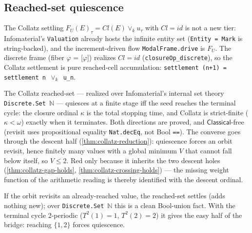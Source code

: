 \subsection{Reached-set quiescence}

\begin{theorem}[Collatz settlement realised ($Cl = id$)]
  \label{thm:collatz-settlement-realised}
  \leanok
  The Collatz settling $F_U(E)_\tau = Cl(E)\vee_k u_\tau$ with $Cl=id$ is not a
  new tier: Infomaterial's \texttt{Valuation} already hosts the infinite entity set
  (\texttt{Entity = Mark} is string-backed), and the increment-driven flow
  \texttt{ModalFrame.drive} is $F_U$. The discrete frame
  (fiber $\varphi$ = [$\varphi$]) realizes $Cl=id$ (\texttt{closureOp\_discrete}),
  so the Collatz settlement is pure reached-cell accumulation:
  \texttt{settlement (n+1) = settlement n $\vee_k$ u_n}.
\end{theorem}

\begin{theorem}
  \label{thm:collatz-kappa-stopping-time}
  \notready
  The Collatz reached-set --- realized over Infomaterial's internal set theory
  \texttt{Discrete.Set}~$\mathbb{N}$ --- quiesces at a finite stage iff the seed
  reaches the terminal cycle: the closure ordinal $\kappa$ is the total stopping
  time, and Collatz is strict-finite ($\kappa<\omega$) exactly when it
  terminates. Both directions are proved, and $\mathsf{Classical}$-free
  (revisit uses propositional equality \texttt{Nat.decEq}, not Bool
  \texttt{==}). The converse goes through the descent half
  (\cref{thm:collatz-reduction}): quiescence forces an orbit revisit, hence
  finitely many values with a global minimum $V$ that cannot fall below itself,
  so $V\le 2$. Red only because it inherits the two descent holes
  (\cref{thm:collatz-gap-holds}, \cref{thm:collatz-crossing-holds}) --- the
  missing weight function of the arithmetic reading is thereby identified with
  the descent ordinal.
\end{theorem}

\begin{theorem}
  \label{thm:collatz-quiesce-of-terminal}
  \leanok
  If the orbit revisits an already-reached value, the reached-set settles (adds
  nothing new); over \texttt{Discrete.Set}~$\mathbb{N}$ this is a clean
  Bool-union fact. With the terminal cycle 2-periodic ($T^2(1)=1$,
  $T^2(2)=2$) it gives the easy half of the bridge: reaching $\{1,2\}$ forces
  quiescence.
\end{theorem}
